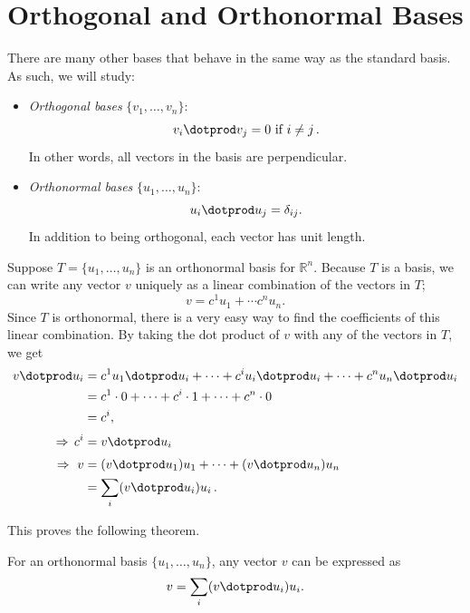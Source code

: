 \section{Orthogonal and Orthonormal Bases}

There are many other bases that  behave in the same way as the standard basis.  As such, we will study:
\begin{itemize}
\item \emph{Orthogonal bases} $\{v_1, \ldots, v_n \}$:
\[
v_i\dotprod v_j=0 \text{ if } i\neq j\, .
\]
In other words, all vectors in the basis are perpendicular.

\item \emph{Orthonormal bases} $\{u_1, \ldots, u_n \}$:
\[
u_i\dotprod u_j = \delta_{ij}.
\]
In addition to being orthogonal, each vector has unit length.
\end{itemize}

Suppose $T=\{u_1, \ldots, u_n \}$ is an orthonormal basis for $\mathbb{R}^n$.  Because $T$ is a basis, we can write any vector $v$ uniquely as a linear combination of the vectors in $T$;
\[
v=c^1u_1+\cdots c^nu_n.
\]
Since $T$ is orthonormal, there is a very easy way to find the coefficients of this linear combination.  By taking the dot product of $v$ with any of the vectors in $T$, we get
\begin{align*}
v\dotprod u_i &= c^1u_1\dotprod u_i + \cdots + c^iu_i\dotprod u_i + \cdots + c^nu_n\dotprod u_i \\
& = c^1\cdot 0 + \cdots + c^i\cdot 1 + \cdots + c^n\cdot 0 \\
& = c^i, \\[1mm]
\Rightarrow\, c^i &= v\dotprod u_i \\[1mm]
\Rightarrow\  v &= (v\dotprod u_1) u_1 + \cdots + (v\dotprod u_n)u_n\\
&= \sum_i (v\dotprod u_i)u_i\, .
\end{align*}

This proves the following theorem.
\begin{theorem}
For an orthonormal basis $\{u_1, \ldots, u_n \}$, any vector $v$ can be expressed as
\[
v =\sum_i (v\dotprod u_i)u_i.
\]
\end{theorem}


